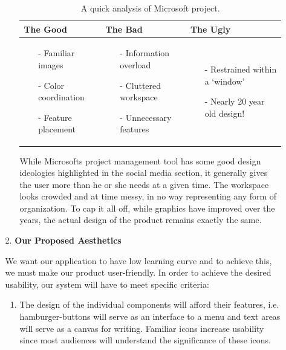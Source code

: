 \begin{enumerate}
\begin{enumerate}
\begin{enumerate}
\begin{table}[ht]
\centering
\begin{tabularx}{\textwidth}{|X|X|X|}
  \hline
  \textbf{The Good} & \textbf{The Bad} & \textbf{The Ugly} \\
  \hline
  \begin{itemize}
    \item[-] Familiar images
    \item[-] Color coordination
    \item[-] Feature placement
  \end{itemize} &
  \begin{itemize}
    \item[-] Information overload
    \item[-] Cluttered workspace
    \item[-] Unnecessary features
  \end{itemize} &
  \begin{itemize}
    \item[-] Restrained within a \textquoteleft{window}\textquoteright
    \item[-] Nearly 20 year old design!
  \end{itemize} \\
  \hline
\end{tabularx}
\caption{A quick analysis of Microsoft project.}
\end{table}
\FloatBarrier
While Microsoft\textsc{}s project management tool has some good design ideologies highlighted in the social media section, it generally gives the user more than he or she needs at a given time. The workspace looks crowded and at time messy, in no way representing any form of organization. To cap it all off, while graphics have improved over the years, the actual design of the product remains exactly the same.
\end{enumerate} 
\item[2.] \textbf{Our Proposed Aesthetics} 
\par We want our application to have low learning curve and to achieve this, we must make our product user-friendly. In order to achieve the desired usability, our system will have to meet specific criteria:
\begin{enumerate}
\item The design of the individual components will afford their features, i.e. hamburger-buttons will serve as an interface to a menu and text areas will serve as a canvas for writing. Familiar icons increase usability since most audiences will understand the significance of these icons.

\end{enumerate}
\end{enumerate}
\end{enumerate}
